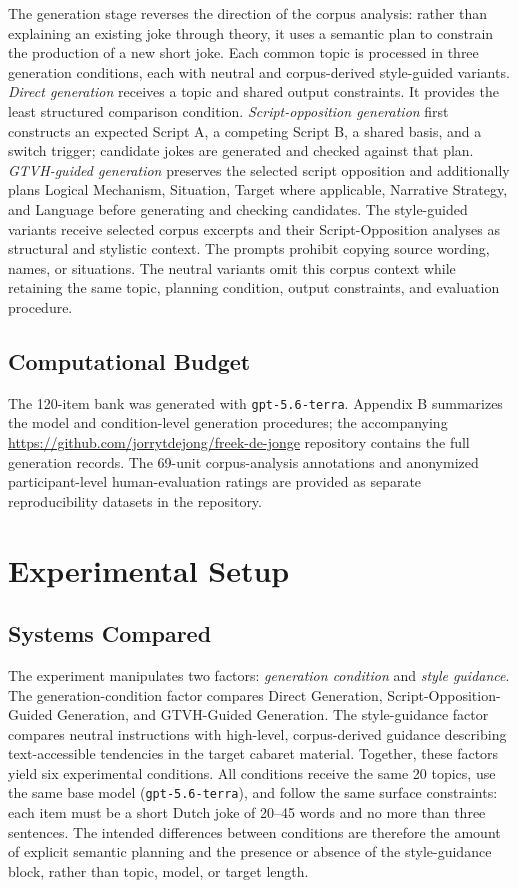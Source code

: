 \documentclass[11pt]{article}
\begin{document}
The generation stage reverses the direction of the corpus analysis: rather than explaining an existing joke through theory, it uses a semantic plan to constrain the production of a new short joke. Each common topic is processed in three generation conditions, each with neutral and corpus-derived style-guided variants. \emph{Direct generation} receives a topic and shared output constraints. It provides the least structured comparison condition. \emph{Script-opposition generation} first constructs an expected Script A, a competing Script B, a shared basis, and a switch trigger; candidate jokes are generated and checked against that plan. \emph{GTVH-guided generation} preserves the selected script opposition and additionally plans Logical Mechanism, Situation, Target where applicable, Narrative Strategy, and Language before generating and checking candidates. The style-guided variants receive selected corpus excerpts and their Script-Opposition analyses as structural and stylistic context. The prompts prohibit copying source wording, names, or situations. The neutral variants omit this corpus context while retaining the same topic, planning condition, output constraints, and evaluation procedure.

\subsection{Computational Budget}\label{computational-budget}

The 120-item bank was generated with \texttt{gpt-5.6-terra}. Appendix B summarizes the model and condition-level generation procedures; the accompanying \url{https://github.com/jorrytdejong/freek-de-jonge} repository contains the full generation records. The 69-unit corpus-analysis annotations and anonymized participant-level human-evaluation ratings are provided as separate reproducibility datasets in the repository.

\section{Experimental Setup}\label{experimental-setup}

\subsection{Systems Compared}\label{systems-compared}

The experiment manipulates two factors: \emph{generation condition} and \emph{style guidance}. The generation-condition factor compares Direct Generation, Script-Opposition-Guided Generation, and GTVH-Guided Generation. The style-guidance factor compares neutral instructions with high-level, corpus-derived guidance describing text-accessible tendencies in the target cabaret material. Together, these factors yield six experimental conditions. All conditions receive the same 20 topics, use the same base model (\texttt{gpt-5.6-terra}), and follow the same surface constraints: each item must be a short Dutch joke of 20--45 words and no more than three sentences. The intended differences between conditions are therefore the amount of explicit semantic planning and the presence or absence of the style-guidance block, rather than topic, model, or target length.
\end{document}
